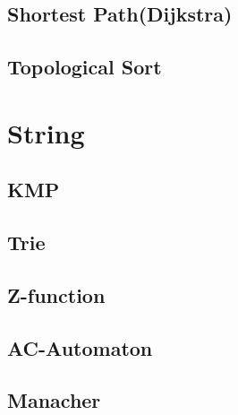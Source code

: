 \subsection{Shortest Path(Dijkstra)}
\raggedbottom
\subsection{Topological Sort}
\raggedbottom
\section{String}
\subsection{KMP}
\raggedbottom
\subsection{Trie}
\raggedbottom
\subsection{Z-function}
\raggedbottom
\subsection{AC-Automaton}
\raggedbottom
\subsection{Manacher}
\raggedbottom
\hrulefill
\pagebreak
